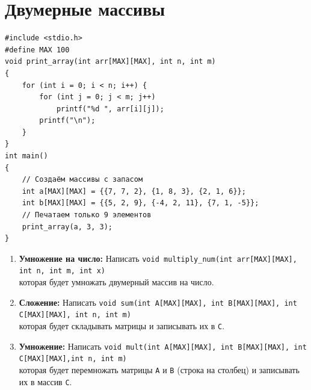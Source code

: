 \documentclass{article}
\begin{document}
\section*{Двумерные массивы}
\begin{lstlisting}
#include <stdio.h>
#define MAX 100
void print_array(int arr[MAX][MAX], int n, int m) 
{
	for (int i = 0; i < n; i++) {
		for (int j = 0; j < m; j++)
			printf("%d ", arr[i][j]);
		printf("\n");
	}
}
int main() 
{
	// Создаём массивы с запасом
	int a[MAX][MAX] = {{7, 7, 2}, {1, 8, 3}, {2, 1, 6}};
	int b[MAX][MAX] = {{5, 2, 9}, {-4, 2, 11}, {7, 1, -5}};
	// Печатаем только 9 элементов
	print_array(a, 3, 3);
}
\end{lstlisting}
\begin{enumerate}
\item \textbf{Умножение на число:} Написать
\texttt{void multiply\_num(int arr[MAX][MAX], int n, int m, int x)}\\
которая будет умножать двумерный массив на число.
\item \textbf{Сложение:} Написать
\texttt{void sum(int A[MAX][MAX], int B[MAX][MAX], int C[MAX][MAX], int n, int m)}\\
которая будет складывать матрицы и записывать их в \texttt{C}.
\item \textbf{Умножение:} Написать
\texttt{void mult(int A[MAX][MAX], int B[MAX][MAX], int C[MAX][MAX],int n, int m)}\\
которая будет перемножать матрицы \texttt{A} и \texttt{B} (строка на столбец) и записывать их в массив \texttt{C}.

\end{enumerate}
\end{document}
